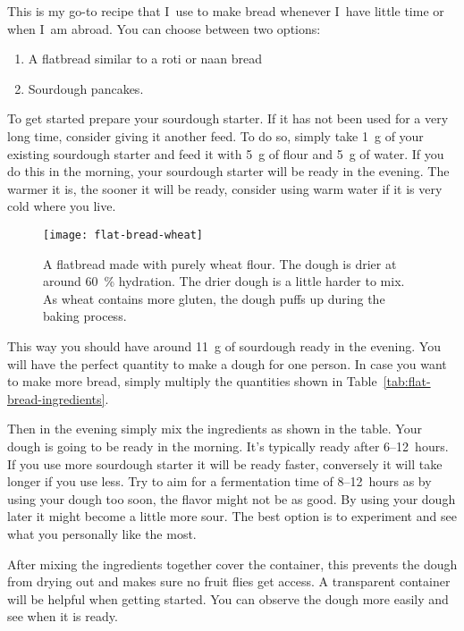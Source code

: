This is my go-to recipe that I~use to make bread whenever
I~have little time or when I~am abroad. You can choose
between two options:
%
\begin{enumerate}
    \item A flatbread similar to a roti or naan bread
    \item Sourdough pancakes.
\end{enumerate}

To get started prepare your sourdough starter. If it has not been used for a very
long time, consider giving it another feed. To do so, simply take \qty{1}{\gram} of your
existing sourdough starter and feed it with \qty{5}{\gram} of flour and \qty{5}{\gram} of water.
If you do this in the morning, your sourdough starter will be ready in the evening. The
warmer it is, the sooner it will be ready,  consider
using warm water if it is very cold where you live.

\begin{figure}[htb!]
\begin{center}
  \texttt{[image: flat-bread-wheat]}
  \caption[Wheat flatbread]{A flatbread made with purely wheat flour. The
      dough is drier at around \qty{60}{\percent} hydration. The drier dough
      is a little harder to mix. As wheat contains more gluten, the dough
      puffs up during the baking process.}
\end{center}
\end{figure}

This way you should have around \qty{11}{\gram} of sourdough ready in the evening. You will have
the perfect quantity to make a dough for one person. In case you want to make more
bread, simply multiply the quantities shown in
Table~\ref{tab:flat-bread-ingredients}.

Then in the evening simply mix the ingredients as shown in the table. Your dough
is going to be ready in the morning. It's typically ready after 6--12~hours. If
you use more sourdough starter it will be ready faster, conversely it will take
longer if you use less. Try to aim for a fermentation time of 8--12~hours as
by using your dough too soon, the flavor might not be as good. By using your
dough later it might become a little more sour. The best option is to
experiment and see what you personally like the most.

After mixing the ingredients together cover the container, this prevents the
dough from drying out and makes
sure no fruit flies get access. A transparent container will be helpful
when getting started. You can observe the dough more easily and see when
it is ready.

